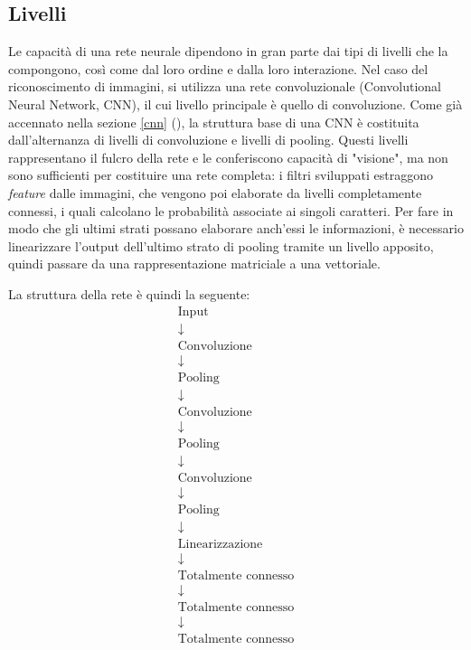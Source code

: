 \documentclass[a4paper,12pt]{article}
\begin{document}
\subsection{Livelli}
Le capacità di una rete neurale dipendono in gran parte dai tipi di livelli che la compongono, così come dal loro ordine e dalla loro interazione.
Nel caso del riconoscimento di immagini, si utilizza una rete convoluzionale (Convolutional Neural Network, CNN), il cui livello principale è quello di convoluzione.
Come già accennato nella sezione \ref{cnn} (), la struttura base di una CNN è costituita dall'alternanza di livelli di convoluzione e livelli di pooling.
Questi livelli rappresentano il fulcro della rete e le conferiscono capacità di "visione", ma non sono sufficienti per costituire una rete completa: i filtri sviluppati estraggono \textit{feature} dalle immagini, che vengono poi elaborate da livelli completamente connessi, i quali calcolano le probabilità associate ai singoli caratteri.
Per fare in modo che gli ultimi strati possano elaborare anch'essi le informazioni, è necessario linearizzare l'output dell'ultimo strato di pooling tramite un livello apposito, quindi passare da una rappresentazione matriciale a una vettoriale.

La struttura della rete è quindi la seguente:
\begin{gather*}
    \text{Input} \\
    \downarrow \\
    \text{Convoluzione} \\
    \downarrow \\
    \text{Pooling} \\
    \downarrow \\
    \text{Convoluzione} \\
    \downarrow \\
    \text{Pooling} \\
    \downarrow \\
    \text{Convoluzione} \\
    \downarrow \\
    \text{Pooling} \\
    \downarrow \\
    \text{Linearizzazione} \\
    \downarrow \\
    \text{Totalmente connesso} \\
    \downarrow \\
    \text{Totalmente connesso} \\
    \downarrow \\
    \text{Totalmente connesso}
\end{gather*}
\end{document}
